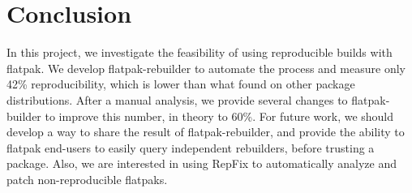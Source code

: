 \documentclass[a4paper,11pt,oneside]{report}
\theoremstyle{definition}
\newcommand{\sysname}{flatpak-rebuilder\xspace}
\newcommand{\rb}{reproducible builds\xspace}
\newcommand{\fp}{flatpak\xspace}
\newcommand{\fb}{flatpak-builder\xspace}
\begin{document}
\chapter{Conclusion}

In this project, we investigate the feasibility of using \rb with \fp. We
develop \sysname to automate the process and measure only 42\% reproducibility,
which is lower than what found on other package distributions. After a manual
analysis, we provide several changes to \fb to improve this number, in theory
to 60\%. For future work, we should develop a way to share the result of
\sysname, and provide the ability to \fp end-users to easily query independent
rebuilders, before trusting a package. Also, we are interested in using RepFix
to automatically analyze and patch non-reproducible flatpaks.

\cleardoublepage
{}
{}
\printbibliography
\end{document}
